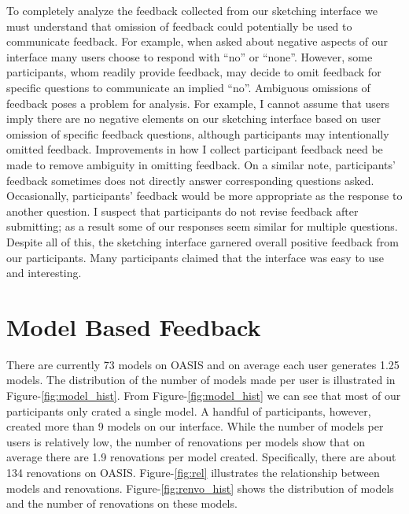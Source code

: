 To completely analyze the feedback collected from our sketching interface we must understand that omission of feedback could potentially be used to communicate feedback.  For example, when asked about negative aspects of our interface many users choose to respond with ``no'' or ``none''.  However, some participants, whom readily provide feedback, may decide to omit feedback for specific questions to communicate an implied ``no''.  Ambiguous omissions of feedback poses a problem for analysis.  For example, I cannot assume that users imply there are no negative elements on our sketching interface based on user omission of specific feedback questions, although participants may intentionally omitted feedback.  Improvements in how I collect participant feedback need be made to remove ambiguity in omitting feedback.  On a similar note, participants' feedback sometimes does not directly answer corresponding questions asked.  Occasionally, participants' feedback would be more appropriate as the response to another question.  I suspect that participants do not revise feedback after submitting; as a result some of our responses seem similar for multiple questions. \\ 

Despite all of this, the sketching interface garnered overall positive feedback from our participants.  Many participants claimed that the interface was easy to use and interesting.  \\
 
\section{Model Based Feedback}

There are currently 73 models on OASIS and on average each user generates 1.25 models.  The distribution of the number of models made per user is illustrated in Figure-\ref{fig:model_hist}.  From Figure-\ref{fig:model_hist} we can see that most of our participants only crated a single model.  A handful of participants, however, created more than 9 models on our interface.  While the number of models per users is relatively low, the number of renovations per models show that on average there are 1.9 renovations per model created.  Specifically, there are about 134 renovations on OASIS.  Figure-\ref{fig:rel} illustrates the relationship between models and renovations.  Figure-\ref{fig:renvo_hist} shows the distribution of models and the number of renovations on these models. \\ 


